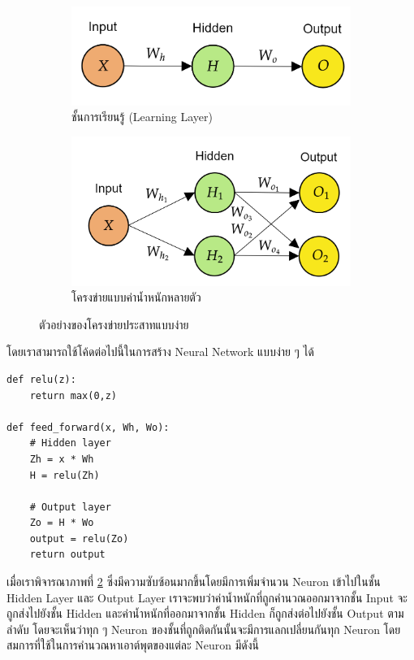 \begin{figure}[H]
    \centering
    \begin{subfigure}{0.5\textwidth}
        \centering
        \includegraphics[width=0.9\linewidth]{fig/nn_layer.png}
        \caption{ชั้นการเรียนรู้ (Learning Layer)}
        \label{fig:nn_layer}
    \end{subfigure}%
    \begin{subfigure}{0.5\textwidth}
        \centering
        \includegraphics[width=0.9\linewidth]{fig/nn_w_matrices.png}
        \caption{โครงข่ายแบบค่าน้ำหนักหลายตัว}
        \label{fig:nn_w_matrices}
    \end{subfigure}
    \caption{ตัวอย่างของโครงข่ายประสาทแบบง่าย}
    \label{fig:nn_layer_w}
\end{figure}

โดยเราสามารถใช้โค้ดต่อไปนี้ในการสร้าง Neural Network แบบง่าย ๆ ได้

\begin{lstlisting}[style=MyPython]
def relu(z):
    return max(0,z)

def feed_forward(x, Wh, Wo):
    # Hidden layer
    Zh = x * Wh
    H = relu(Zh)

    # Output layer
    Zo = H * Wo
    output = relu(Zo)
    return output
\end{lstlisting}

\vspace{1em}

เมื่อเราพิจารณาภาพที่ \ref{fig:nn_w_matrices} ซึ่งมีความซับซ้อนมากขึ้นโดยมีการเพิ่มจำนวน Neuron เข้าไปในชั้น Hidden Layer และ
Output Layer เราจะพบว่าค่าน้ำหนักที่ถูกคำนวณออกมาจากชั้น Input จะถูกส่งไปยังชั้น Hidden และค่าน้ำหนักที่ออกมาจากชั้น Hidden ก็ถูกส่งต่อไปยังชั้น Output ตามลำดับ โดยจะเห็นว่าทุก ๆ Neuron ของชั้นที่ถูกติดกันนั้นจะมีการแลกเปลี่ยนกันทุก Neuron โดยสมการที่ใช้ในการคำนวณหาเอาต์พุตของแต่ละ Neuron มีดังนี้

